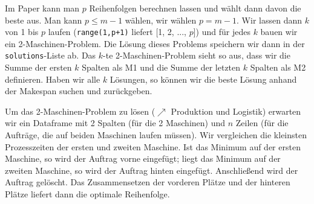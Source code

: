 \documentclass{article}
\begin{document}
	Im Paper kann man $p$ Reihenfolgen berechnen lassen und wählt dann davon die beste aus. Man kann $p\le m-1$ wählen, wir wählen $p=m-1$. Wir lassen dann $k$ von 1 bis $p$ laufen (\texttt{range(1,p+1)} liefert [1, 2, ..., $p$]) und für jedes $k$ bauen wir ein 2-Maschinen-Problem. Die Lösung dieses Problems speichern wir dann in der \texttt{solutions}-Liste ab. Das $k$-te 2-Maschinen-Problem sieht so aus, dass wir die Summe der ersten $k$ Spalten als M1 und die Summe der letzten $k$ Spalten als M2 definieren. Haben wir alle $k$ Lösungen, so können wir die beste Lösung anhand der Makespan suchen und zurückgeben.
	
	Um das 2-Maschinen-Problem zu lösen ($\nearrow$ Produktion und Logistik) erwarten wir ein Dataframe mit 2 Spalten (für die 2 Maschinen) und $n$ Zeilen (für die Aufträge, die auf beiden Maschinen laufen müssen). Wir vergleichen die kleinsten Prozesszeiten der ersten und zweiten Maschine. Ist das Minimum auf der ersten Maschine, so wird der Auftrag vorne eingefügt; liegt das Minimum auf der zweiten Maschine, so wird der Auftrag hinten eingefügt. Anschließend wird der Auftrag gelöscht. Das Zusammensetzen der vorderen Plätze und der hinteren Plätze liefert dann die optimale Reihenfolge.
\end{document}
